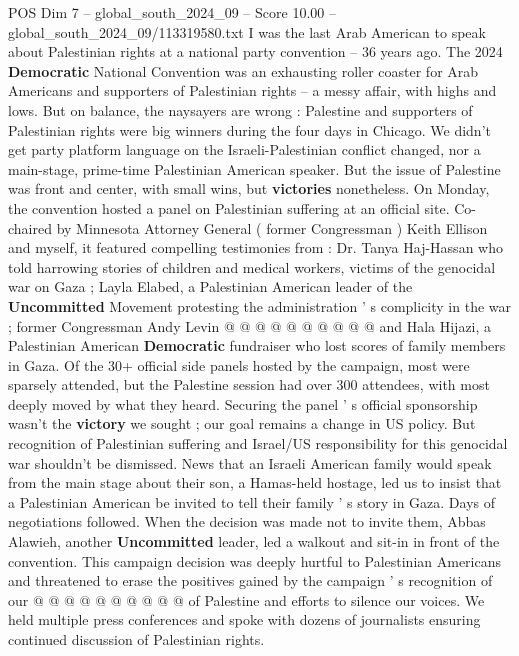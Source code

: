\begin{textsample}{POS Dim 7 – global\_south\_2024\_09 – Score 10.00 – global\_south\_2024\_09/113319580.txt}  \label{ex:f7_pos_228}
I was the last Arab American to speak about Palestinian rights at a national party convention -- 36 years ago.
The 2024 \textbf{Democratic} National Convention was an exhausting roller coaster for Arab Americans and supporters of Palestinian rights -- a messy affair, with highs and lows.
But on balance, the naysayers are wrong : Palestine and supporters of Palestinian rights were big winners during the four days in Chicago.
We didn't get party platform language on the Israeli-Palestinian conflict changed, nor a main-stage, prime-time Palestinian American speaker.
But the issue of Palestine was front and center, with small wins, but \textbf{victories} nonetheless.
On Monday, the convention hosted a panel on Palestinian suffering at an official site.
Co-chaired by Minnesota Attorney General ( former Congressman ) Keith Ellison and myself, it featured compelling testimonies from : Dr.
Tanya Haj-Hassan who told harrowing stories of children and medical workers, victims of the genocidal war on Gaza ; Layla Elabed, a Palestinian American leader of the \textbf{Uncommitted} Movement protesting the administration ' s complicity in the war ; former Congressman Andy Levin @ @ @ @ @ @ @ @ @ @ and Hala Hijazi, a Palestinian American \textbf{Democratic} fundraiser who lost scores of family members in Gaza.
Of the 30+ official side panels hosted by the campaign, most were sparsely attended, but the Palestine session had over 300 attendees, with most deeply moved by what they heard.
Securing the panel ' s official sponsorship wasn't the \textbf{victory} we sought ; our goal remains a change in US policy.
But recognition of Palestinian suffering and Israel/US responsibility for this genocidal war shouldn't be dismissed.
News that an Israeli American family would speak from the main stage about their son, a Hamas-held hostage, led us to insist that a Palestinian American be invited to tell their family ' s story in Gaza.
Days of negotiations followed.
When the decision was made not to invite them, Abbas Alawieh, another \textbf{Uncommitted} leader, led a walkout and sit-in in front of the convention.
This campaign decision was deeply hurtful to Palestinian Americans and threatened to erase the positives gained by the campaign ' s recognition of our @ @ @ @ @ @ @ @ @ @ of Palestine and efforts to silence our voices.
We held multiple press conferences and spoke with dozens of journalists ensuring continued discussion of Palestinian rights.

\end{textsample}
